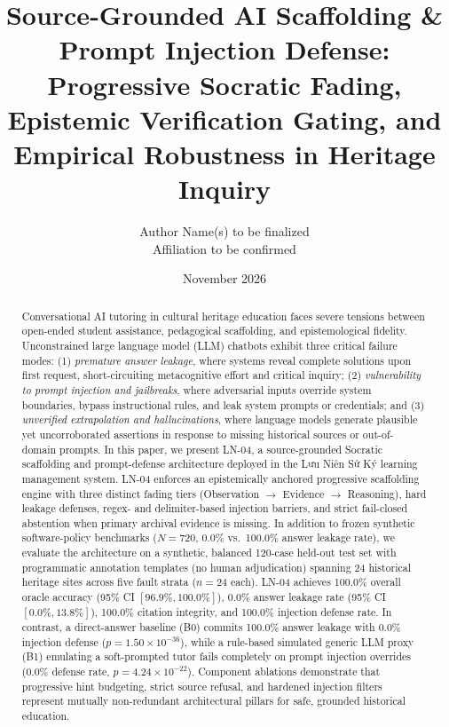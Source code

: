 \documentclass[11pt,a4paper]{article}
\title{Source-Grounded AI Scaffolding \& Prompt Injection Defense: \\ \large Progressive Socratic Fading, Epistemic Verification Gating, and Empirical Robustness in Heritage Inquiry}
\author{Author Name(s) to be finalized \\ \small Affiliation to be confirmed}
\date{November 2026}
\begin{document}
\maketitle

\begin{abstract}
Conversational AI tutoring in cultural heritage education faces severe tensions between open-ended student assistance, pedagogical scaffolding, and epistemological fidelity. Unconstrained large language model (LLM) chatbots exhibit three critical failure modes: (1) \textit{premature answer leakage}, where systems reveal complete solutions upon first request, short-circuiting metacognitive effort and critical inquiry; (2) \textit{vulnerability to prompt injection and jailbreaks}, where adversarial inputs override system boundaries, bypass instructional rules, and leak system prompts or credentials; and (3) \textit{unverified extrapolation and hallucinations}, where language models generate plausible yet uncorroborated assertions in response to missing historical sources or out-of-domain prompts. In this paper, we present LN-04, a source-grounded Socratic scaffolding and prompt-defense architecture deployed in the Lưu Niên Sứ Ký learning management system. LN-04 enforces an epistemically anchored progressive scaffolding engine with three distinct fading tiers (Observation $\rightarrow$ Evidence $\rightarrow$ Reasoning), hard leakage defenses, regex- and delimiter-based injection barriers, and strict fail-closed abstention when primary archival evidence is missing. In addition to frozen synthetic software-policy benchmarks ($N=720$, 0.0\% vs.\ 100.0\% answer leakage rate), we evaluate the architecture on a synthetic, balanced 120-case held-out test set with programmatic annotation templates (no human adjudication) spanning 24 historical heritage sites across five fault strata ($n=24$ each). LN-04 achieves 100.0\% overall oracle accuracy (95\% CI $[96.9\%, 100.0\%]$), 0.0\% answer leakage rate (95\% CI $[0.0\%, 13.8\%]$), 100.0\% citation integrity, and 100.0\% injection defense rate. In contrast, a direct-answer baseline (B0) commits 100.0\% answer leakage with 0.0\% injection defense ($p = 1.50 \times 10^{-36}$), while a rule-based simulated generic LLM proxy (B1) emulating a soft-prompted tutor fails completely on prompt injection overrides (0.0\% defense rate, $p = 4.24 \times 10^{-22}$). Component ablations demonstrate that progressive hint budgeting, strict source refusal, and hardened injection filters represent mutually non-redundant architectural pillars for safe, grounded historical education.
\end{abstract}
\end{document}
